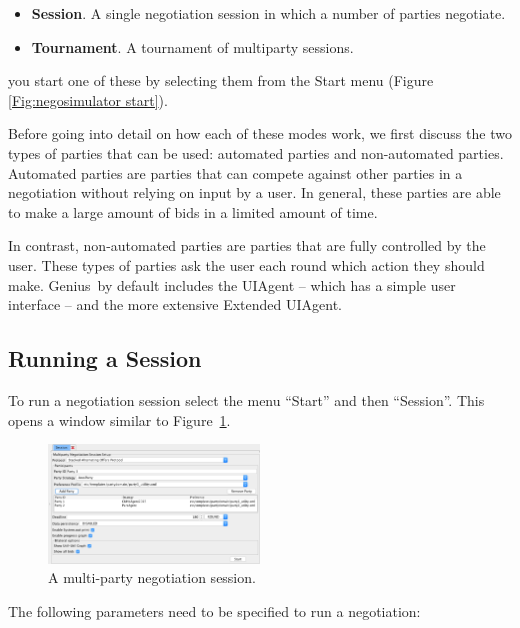 \documentclass[]{article}
\newcommand\Genius{{\sc Genius}}
\begin{document}
\begin{itemize}
	\item \textbf{Session}. A single negotiation session in which a number of parties negotiate.
	\item \textbf{Tournament}. A tournament of multiparty sessions.
\end{itemize}

you start one of these by selecting them from the Start menu (Figure \ref{Fig:negosimulator start}).

Before going into detail on how each of these modes work, we first discuss the two types of parties that can be used: automated parties and non-automated parties. Automated parties are parties that can compete against other parties in a negotiation without relying on input by a user. In general, these parties are able to make a large amount of bids in a limited amount of time.

In contrast, non-automated parties are parties that are fully controlled by the user. These types of parties ask the user each round which action they should make. {\Genius}~by default includes the UIAgent -- which has a simple user interface -- and the more extensive Extended UIAgent.


\subsection{Running a Session}\label{sec:singlesessionrun}
To run a negotiation session select the menu ``Start'' and then ``Session''. This opens a window similar to Figure~\ref{Fig:multipartysession}. 

\begin{figure}[h!]
	\centering
	\includegraphics[width=0.5\textwidth]{media/multipartysession.png}
\caption{A multi-party negotiation session.}\label{Fig:multipartysession}
\end{figure}

The following parameters need to be specified to run a negotiation:
\end{document}
